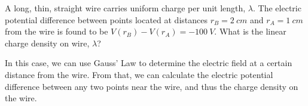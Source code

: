 \begin{example}{A long, thin, straight wire carries uniform charge per unit length, $\lambda$. The electric potential difference between points located at distances $r_B=\SI{2}{cm}$ and $r_A=\SI{1}{cm}$ from the wire is found to be $V(r_B)-V(r_A)=\SI{-100}{V}$. What is the linear charge density on wire, $\lambda$?
	
}

In this case, we can use Gauss' Law to determine the electric field at a certain distance from the wire. From that, we can calculate the electric potential difference between any two points near the wire, and thus the charge density on the wire.


\end{example}

